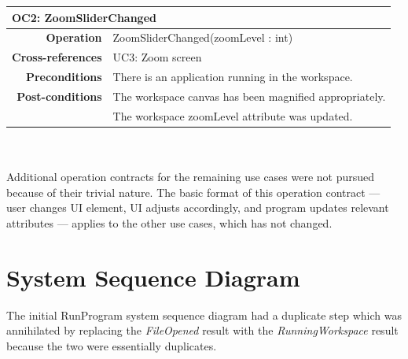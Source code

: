 \documentclass[12pt]{article}
\begin{document}
\begin{tabular*}{\textwidth}{r | l}
  \multicolumn{2}{l}{\textbf{OC2: ZoomSliderChanged}} \\ \hline
  \textbf{Operation} & ZoomSliderChanged(zoomLevel : int) \\
  \textbf{Cross-references} & UC3: Zoom screen \\
  \textbf{Preconditions} & There is an application running in the workspace. \\
  \textbf{Post-conditions} & The workspace canvas has been magnified appropriately. \\
                           & The workspace zoomLevel attribute was updated. \\ \hline
\end{tabular*} \\\\

Additional operation contracts for the remaining use cases were not pursued because of their trivial nature. The basic format of this operation contract --- user changes UI element, UI adjusts accordingly, and program updates relevant attributes --- applies to the other use cases, which has not changed.

\clearpage

\section{System Sequence Diagram}
The initial RunProgram system sequence diagram had a duplicate step which was annihilated by replacing the \textit{FileOpened} result with the \textit{RunningWorkspace} result because the two were essentially duplicates.
\end{document}
